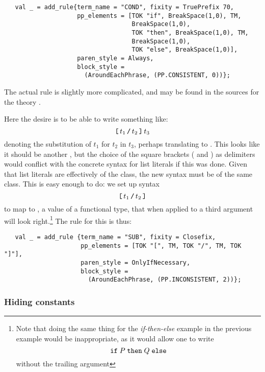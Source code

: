 {\begin{description}
\begin{verbatim}
   val _ = add_rule{term_name = "COND", fixity = TruePrefix 70,
                    pp_elements = [TOK "if", BreakSpace(1,0), TM,
                                   BreakSpace(1,0),
                                   TOK "then", BreakSpace(1,0), TM,
                                   BreakSpace(1,0),
                                   TOK "else", BreakSpace(1,0)],
                    paren_style = Always,
                    block_style =
                      (AroundEachPhrase, (PP.CONSISTENT, 0))};
\end{verbatim}
\noindent The actual rule is slightly more complicated, and
may be found in the sources for the theory .

\item[Mix-fix syntax for term substitution:]

 Here the desire is to be able
  to write something like:
  \[
  \mbox{\texttt{[}}\,t_1\,\mbox{\texttt{/}}\,t_2\,\mbox{\texttt{]}}\,t_3
  \]
  denoting the substitution of $t_1$ for $t_2$ in $t_3$, perhaps
  translating to .  This looks
like it should be another , but the choice of the
square brackets (\holtxt{[} and \holtxt{]}) as delimiters would
conflict with the concrete syntax for list literals if this was done.
Given that list literals are effectively of the 
class, the new syntax must be of the same class.  This is easy enough
to do: we set up syntax
\[
\holtxt{[}\,t_1\,\holtxt{/}\,t_2\,\holtxt{]}
\]
to map to , a value of a functional
type, that when applied to a third argument will look
right.\footnote{Note that doing the same thing for the
  \textit{if-then-else} example in the previous example would be
  inappropriate, as it would allow one to write \[
  \holtxt{if}\;P\;\holtxt{then}\;Q\;\holtxt{else}
  \] without the trailing argument}
  The rule for this is thus:
\begin{verbatim}
   val _ = add_rule {term_name = "SUB", fixity = Closefix,
                     pp_elements = [TOK "[", TM, TOK "/", TM, TOK "]"],
                     paren_style = OnlyIfNecessary,
                     block_style =
                       (AroundEachPhrase, (PP.INCONSISTENT, 2))};
\end{verbatim}


\end{description}

\subsubsection{Hiding constants}
\label{hidden}

}
